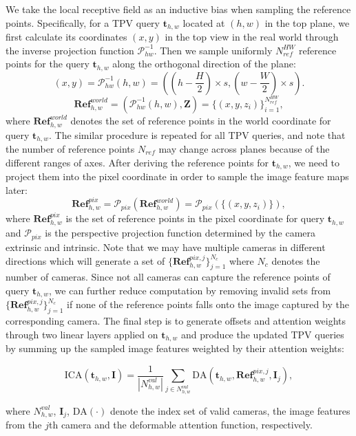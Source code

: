 \documentclass[10pt,twocolumn,letterpaper]{article}
\begin{document}
We take the local receptive field as an inductive bias when sampling the reference points.
Specifically, for a TPV query $\mathbf{t}_{h,w}$ located at $(h,w)$ in the top plane, we first calculate its coordinates $(x,y)$ in the top view in the real world through the inverse projection function $\mathcal{P}_{hw}^{-1}$.
Then we sample uniformly $N_{ref}^{HW}$ reference points for the query $\mathbf{t}_{h,w}$ along the orthogonal direction of the plane:
\begin{equation}
    (x,y) = \mathcal{P}_{hw}^{-1}(h,w) = ((h-\frac{H}{2})\times s, (w-\frac{W}{2})\times s).
\end{equation}
\begin{equation}
    \mathbf{Ref}_{h,w}^{world} = (\mathcal{P}_{hw}^{-1}(h,w), \mathbf{Z}) = \{(x, y, z_{i})\}_{i=1}^{N_{ref}^{HW}},
\end{equation}
where $\mathbf{Ref}_{h,w}^{world}$ denotes the set of reference points in the world coordinate for query $\mathbf{t}_{h,w}$.
The similar procedure is repeated for all TPV queries, and note that the number of reference points $N_{ref}$ may change across planes because of the different ranges of axes. 
After deriving the reference points for $\mathbf{t}_{h,w}$, we need to project them into the pixel coordinate in order to sample the image feature maps later:
\begin{equation}
    \mathbf{Ref}_{h,w}^{pix} = \mathcal{P}_{pix}(\mathbf{Ref}_{h,w}^{world}) = \mathcal{P}_{pix}(\{(x, y, z_{i})\}),
\end{equation}
where $\mathbf{Ref}_{h,w}^{pix}$ is the set of reference points in the pixel coordinate for query $\mathbf{t}_{h,w}$ and $\mathcal{P}_{pix}$ is the perspective projection function determined by the camera extrinsic and intrinsic.
Note that we may have multiple cameras in different directions which will generate a set of $\{\mathbf{Ref}_{h,w}^{pix,j}\}_{j=1}^{N_{c}}$ where $N_{c}$ denotes the number of cameras.
Since not all cameras can capture the reference points of query $\mathbf{t}_{h,w}$, we can further reduce computation by removing invalid sets from $\{\mathbf{Ref}_{h,w}^{pix,j}\}_{j=1}^{N_{c}}$ if none of the reference points falls onto the image captured by the corresponding camera.
The final step is to generate offsets and attention weights through two linear layers applied on $\mathbf{t}_{h,w}$ and produce the updated TPV queries by summing up the sampled image features weighted by their attention weights:
\begin{small}
\begin{equation}
    \mathrm{ICA}(\mathbf{t}_{h,w}, \mathbf{I}) \!=\! \frac{1}{|N_{h,w}^{val}|}\!\sum_{j\in N_{h,w}^{val}}\!\!\mathrm{DA}(\mathbf{t}_{h,w}, \mathbf{Ref}_{h,w}^{pix,j}, \mathbf{I}_{j}),
\end{equation}
\end{small}
where $N_{h,w}^{val}$, $\mathbf{I}_{j}$, $\mathrm{DA}(\cdot)$ denote the index set of valid cameras, the image features from the $j$th camera and the deformable attention function, respectively.
\end{document}
